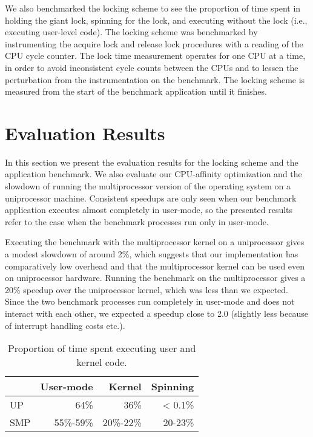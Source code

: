 We also benchmarked the locking scheme to see the proportion of time spent in
holding the giant lock, spinning for the lock, and executing without the lock
(i.e., executing user-level code). The locking scheme was benchmarked by
instrumenting the acquire lock and release lock procedures with a reading of
the CPU cycle counter. The lock time measurement operates for one CPU at a
time, in order to avoid inconsistent cycle counts between the CPUs and to
lessen the perturbation from the instrumentation on the benchmark. The locking
scheme is measured from the start of the benchmark application until it
finishes.



\section{Evaluation Results}
\label{sec:evaluation}
In this section we present the evaluation results for the locking scheme and
the application benchmark. We also evaluate our CPU-affinity optimization and
the slowdown of running the multiprocessor version of the operating system on
a uniprocessor machine.  Consistent speedups are only seen when our benchmark
application executes almost completely in user-mode, so the presented results
refer to the case when the benchmark processes run only in user-mode.

Executing the benchmark with the multiprocessor kernel on a uniprocessor gives
a modest slowdown of around 2\%, which suggests that our implementation has
comparatively low overhead and that the multiprocessor kernel can be used even
on uniprocessor hardware. Running the benchmark on the multiprocessor gives a
20\% speedup over the uniprocessor kernel, which was less than we expected.
Since the two benchmark processes run completely in user-mode and does not
interact with each other, we expected a speedup close to 2.0 (slightly less
because of interrupt handling costs etc.).

\begin{table}[htb]
  \centering
  \caption{Proportion of time spent executing user and kernel code.}
  \begin{tabular}{lrrr}
    & User-mode & Kernel & Spinning \\
    \hline
    UP & 64\% & 36\% & < 0.1\% \\
    SMP & 55\%-59\% & 20\%-22\% & 20-23\% \\
  \end{tabular}
  \label{tab:lock_benchmark}
\end{table}

